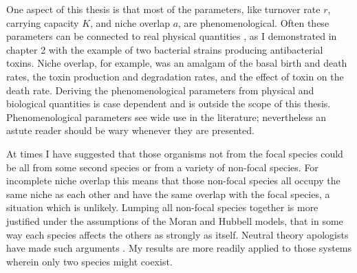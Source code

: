 One aspect of this thesis is that most of the parameters, like turnover rate $r$, carrying capacity $K$, and niche overlap $a$, are phenomenological. 
Often these parameters can be connected to real physical quantities \cite{Caperon1967,MacArthur1967}, as I demonstrated in chapter 2 with the example of two bacterial strains producing antibacterial toxins. 
Niche overlap, for example, was an amalgam of the basal birth and death rates, the toxin production and degradation rates, and the effect of toxin on the death rate. 
Deriving the phenomenological parameters from physical and biological quantities is case dependent and is outside the scope of this thesis. 
Phenomenological parameters see wide use in the literature; nevertheless an astute reader should be wary whenever they are presented. 

At times I have suggested that those organisms not from the focal species could be all from some second species or from a variety of non-focal species. 
For incomplete niche overlap this means that those non-focal species all occupy the same niche as each other and have the same overlap with the focal species, a situation which is unlikely. 
Lumping all non-focal species together is more justified under the assumptions of the Moran and Hubbell models, that in some way each species affects the others as strongly as itself. 
Neutral theory apologists have made such arguments \cite{Hubbell2006,Rosindell2011}. %
My results are more readily applied to those systems wherein only two species might coexist. 


